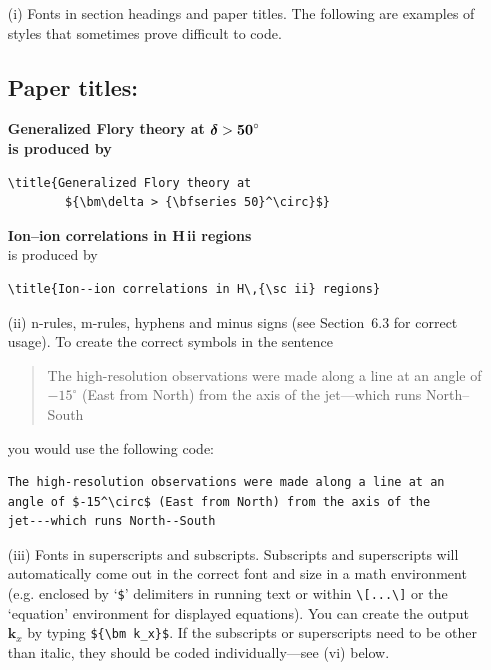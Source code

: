 \documentclass[]{tMAM2e}
\begin{document}
%
\begin{enumerate}
\item[(i)] Fonts in section headings and paper titles. The following are  examples
of styles that sometimes prove difficult to code.


\subsection*{P\lowercase{aper titles:}}

\bf{\noindent Generalized Flory theory at ${\bm\delta >
{\bf
   50}^\circ}$}\\

    \noindent\normalfont is produced by
\begin{verbatim}
\title{Generalized Flory theory at
        ${\bm\delta > {\bfseries 50}^\circ}$}
\end{verbatim}
\bigskip

{\bf{\noindent Ion--ion correlations in H\,{\sc ii} regions}}\\

\noindent\normalfont is produced by
%
\begin{verbatim}
\title{Ion--ion correlations in H\,{\sc ii} regions}
\end{verbatim}



\item[(ii)] n-rules, m-rules, hyphens and minus signs (see Section~6.3 for
correct usage). To create the correct symbols in the sentence
%
\begin{quote}
The high-resolution observations were made along a line at an
angle of $-15^\circ$ (East from North) from the axis of the
jet---which runs North--South
\end{quote}
you would use the following code:
%
\begin{verbatim}
The high-resolution observations were made along a line at an
angle of $-15^\circ$ (East from North) from the axis of the
jet---which runs North--South
\end{verbatim}

\item[(iii)] Fonts in superscripts and subscripts. Subscripts and superscripts will automatically come  out in the correct font
and size in a math environment (e.g. enclosed by `\verb"$"'
delimiters in running text or within \verb"\[...\]" or the
`equation' environment for displayed equations). You can create
the output ${\bm k_x}$ by typing \verb"${\bm k_x}$". If the
subscripts or superscripts need to be other than italic, they
should be coded individually---see (vi) below.


\end{enumerate}
\end{document}
